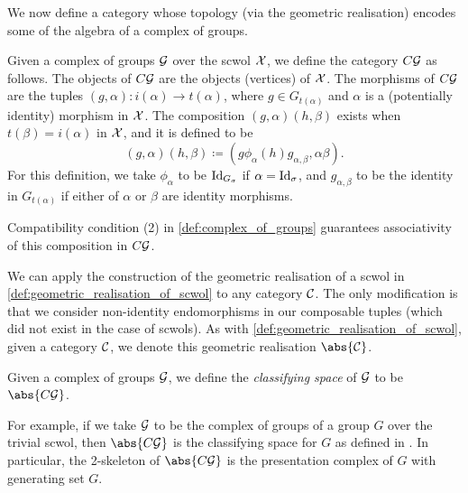 We now define a category whose topology (via the geometric realisation) encodes some of the algebra of a complex of groups.
\begin{definition}
	Given a complex of groups $\mathcal{G}$ over the scwol  $\mathcal{X}$, we define the category $C\mathcal{G}$ as follows.
	The objects of  $C\mathcal{G}$ are the objects (vertices) of $\mathcal{X}$.
	The morphisms of $C\mathcal{G}$ are the tuples $(g,\alpha) \colon i(\alpha) \to t(\alpha)$, where  $g \in G_{t(\alpha)}$ and  $\alpha$ is a (potentially identity) morphism in $\mathcal{X}$.
	The composition  $(g,\alpha)(h,\beta)$ exists when  $t(\beta) = i(\alpha)$ in  $\mathcal{X}$, and it is defined to be
	\[
		(g,\alpha)(h,\beta) \coloneq (g\phi_\alpha(h)g_{\alpha,\beta}, \alpha\beta)
		.\]
	For this definition, we take $\phi_{\alpha}$ to be $\operatorname{Id}_{G_\sigma}$ if $\alpha = \operatorname{Id}_\sigma$, and $g_{\alpha,\beta}$ to be the identity in $G_{t(\alpha)}$ if either of $\alpha$ or  $\beta$ are identity morphisms.
\end{definition}
Compatibility condition (2) in \cref{def:complex_of_groups} guarantees associativity of this composition in  $C\mathcal{G}$.

We can apply the construction of the geometric realisation of a scwol in \cref{def:geometric_realisation_of_scwol} to any category $\mathcal{C}$.
The only modification is that we consider non-identity endomorphisms in our composable tuples (which did not exist in the case of scwols).
As with \cref{def:geometric_realisation_of_scwol}, given a category $\mathcal{C}$, we denote this geometric realisation $\abs{\calc}$.

\begin{definition}
	Given a complex of groups $\mathcal{G}$, we define the \emph{classifying space} of  $\mathcal{G}$ to be  $\abs{C\calg}$.
\end{definition}
For example, if we take $\mathcal{G}$ to be the complex of groups of a group  $G$ over the trivial scwol, then $\abs{C\calg}$ is the classifying space for $G$ as defined in \cite[Example 1B.7]{hatcher_algebraic_2001}.
In particular, the 2-skeleton of $\abs{C\calg}$ is the presentation complex of $G$ with generating set $G$.

